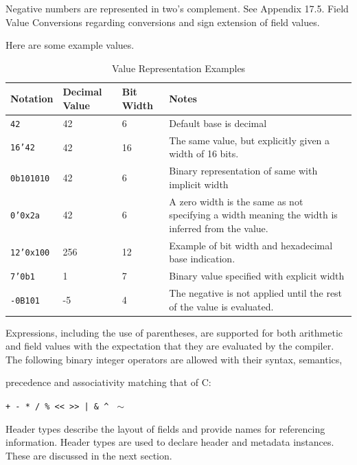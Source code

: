\documentclass[12pt]{article}
\begin{document}
Negative numbers are represented in two's complement. See Appendix 17.5. 
Field Value Conversions regarding conversions and sign extension of field 
values.

Here are some example values.

\begin{table}[H]
\begin{center}
\begin{tabular}{| l | l | l | p{} |} \hline
\textbf{Notation} &
\textbf{Decimal Value} & 
\textbf{Bit Width} &
\textbf{Notes} \\ \hline
\texttt{42} &
42 &
6 &
Default base is decimal \\ \hline
\texttt{16'42} &
42 &
16 &
The same value, but explicitly given a width of 16 bits. \\ \hline
\texttt{0b101010} &
42 &
6 &
Binary representation of same with implicit width \\ \hline
\texttt{0'0x2a} &
42 &
6 &
A zero width is the same as not specifying a width meaning the width is inferred from the value.   \\ \hline
\texttt{12'0x100} &
256 &
12 &
Example of bit width and hexadecimal base indication. \\ \hline
\texttt{7'0b1} &
1 &
7 &
Binary value specified with explicit width \\ \hline
\texttt{-0B101} &
-5 &
4 &
The negative is not applied until the rest of the value is evaluated. \\ \hline
\end{tabular}
\end{center}
\caption{Value Representation Examples}
\end{table}

\vspace{3mm}
Expressions, including the use of parentheses, are supported for both
arithmetic and field values with the expectation that they are
evaluated by the compiler.  The following binary integer operators are
allowed with their syntax, semantics,
 
precedence and associativity matching that of C: 

\centerline{\texttt{+ - * / \% << >>  | \&  \^ } $\sim$ }



Header types describe the layout of fields and provide names for referencing 
information. Header types are used to declare header and metadata instances. 
These are discussed in the next section.
\end{document}
